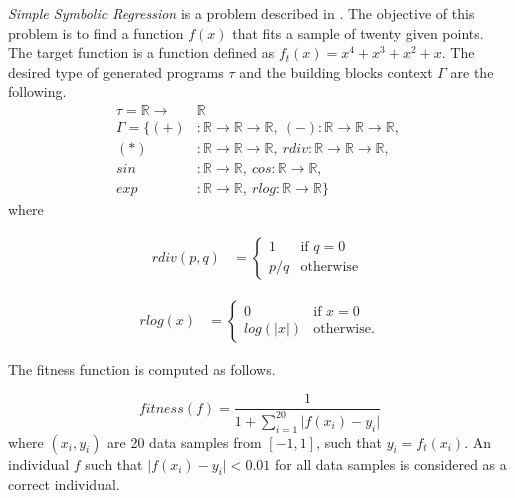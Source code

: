 \documentclass[conference]{IEEEtran}
\newcommand{\ar}{\rightarrow\xspace}
\newcommand{\Real}{\mathbb{R}}
\begin{document}
\textit{Simple Symbolic Regression} is a problem described
in \cite{koza92}. The objective of this problem is to 
find a function $f(x)$ that fits a sample
of twenty given points. The target function is 
a function defined as $f_{t}(x) = x^4 + x^3 + x^2 + x$.  
The desired type of generated programs $\tau$ and 
the building blocks context $\Gamma$ are the following.
\begin{align*}
\tau = \Real \ar &\Real\\
\Gamma = \{
  (+)  &: \Real \ar \Real \ar \Real    ,~ 
  (-)   : \Real \ar \Real \ar \Real    ,~\\
  (*)  &: \Real \ar \Real \ar \Real    ,~ 
  rdiv  : \Real \ar \Real \ar \Real    ,~\\
  sin  &: \Real \ar \Real              ,~ 
  cos   : \Real \ar \Real              ,~\\
  exp  &: \Real \ar \Real              ,~ 
  rlog  : \Real \ar \Real              \}
\end{align*}
where

\noindent
\begin{minipage}{.9\linewidth}
\begin{align*}
rdiv(p,q) &= \begin{cases} 1 &\mbox{if } q = 0 \\
p/q & \mbox{otherwise } \end{cases}  
\end{align*}
\end{minipage}%

\begin{minipage}{.9\linewidth}
\begin{align*}
rlog(x) &= \begin{cases} 0 &\mbox{if } x = 0 \\
log(\vert x\vert) & \mbox{otherwise}. \end{cases}
\end{align*}
\end{minipage}

The fitness function is computed as follows.

$$ fitness(f) =  \frac{1}{1+ \sum\limits_{i=1}^{20}{ \vert f(x_i)-y_i }\vert }  $$
where $(x_i,y_i)$ are 20 data samples from $[-1,1]$, such that $y_i = f_t(x_i)$.
An individual $f$ such that $\vert f(x_i)-y_i \vert < 0.01 $ for all data samples is 
considered as a correct individual.
\end{document}
